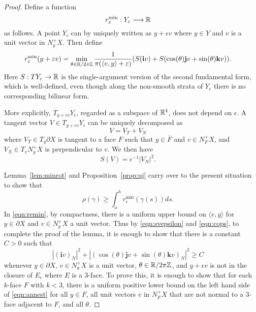 \begin{proof}
Define a function
\[
r^{\min}_\varepsilon:Y_\varepsilon\longrightarrow{\mathbb R}
\]
as follows. A point $Y_\epsilon$ can by uniquely written as $y+\epsilon v$ where $y\in Y$ and $v$ is a unit vector in $N_y^+X$. Then define
\begin{equation}
\label{eqn:remin}
r^{\min}_\varepsilon(y+\varepsilon v) = \min_{\theta\in{\mathbb R}/2\pi{\mathbb Z}}\frac{1}{\pi(\langle v,y\rangle + \varepsilon)}(S({\mathbf i}v) + S(\cos(\theta){\mathbf j}v + \sin(\theta){\mathbf k}v)).
\end{equation}
Here $S:TY_\varepsilon\to{\mathbb R}$ is the single-argument version of the second fundamental form, which is well-defined, even though along the non-smooth strata of $Y_\epsilon$ there is no corresponding bilinear form.

More explicitly, $T_{y+\epsilon v}Y_\epsilon$, regarded as a subspace of ${\mathbb R}^4$, does not depend on $\epsilon$. A tangent vector $V\in T_{y+\epsilon v}Y_\epsilon$ can be uniquely decomposed as
\begin{equation}
\label{eqn:vtn}
V = V_T + V_N
\end{equation}
where $V_T\in T_y\partial X$ is tangent to a face $F$ such that $y\in\overline{F}$ and $v\in N_F^+X$, and $V_N\in T_vN_y^+X$ is perpendicular to $v$. We then have
\begin{equation}
\label{eqn:svepsilon}
S(V) = \epsilon^{-1}|V_N|^2.
\end{equation}

Lemma~\ref{lem:minrot} and Proposition~\ref{prop:uj} carry over to the present situation to show that
\begin{equation}
\label{eqn:cops}
\rho(\gamma) \ge \int_a^b r_\epsilon^{\min}(\gamma(s))ds.
\end{equation}
In \eqref{eqn:remin}, by compactness, there is a uniform upper bound on $\langle v,y\rangle$ for $y\in\partial X$ and $v\in N_y^+X$ a unit vector. Thus by \eqref{eqn:svepsilon} and \eqref{eqn:cops}, to complete the proof of the lemma, it is enough to show that there is a constant $C>0$ such that
\begin{equation}
\label{eqn:annest}
\left|({\mathbf i}v)_N\right|^2 + \left|(\cos(\theta){\mathbf j}v + \sin(\theta){\mathbf k}v)_N\right|^2 \ge C
\end{equation}
whenever $y\in\partial X$, $v\in N_y^+X$ is a unit vector, $\theta\in{\mathbb R}/2\pi{\mathbb Z}$, and $y+\epsilon v$ is not in the closure of $E_\epsilon$ where $E$ is a $3$-face. To prove this, it is enough to show that for each $k$-face $F$ with $k<3$, there is a uniform positive lower bound on the left hand side of \eqref{eqn:annest} for all $y\in F$, all unit vectors $v$ in $N_F^+X$ that are not normal to a $3$-face adjacent to $F$, and all $\theta$.


\end{proof}
